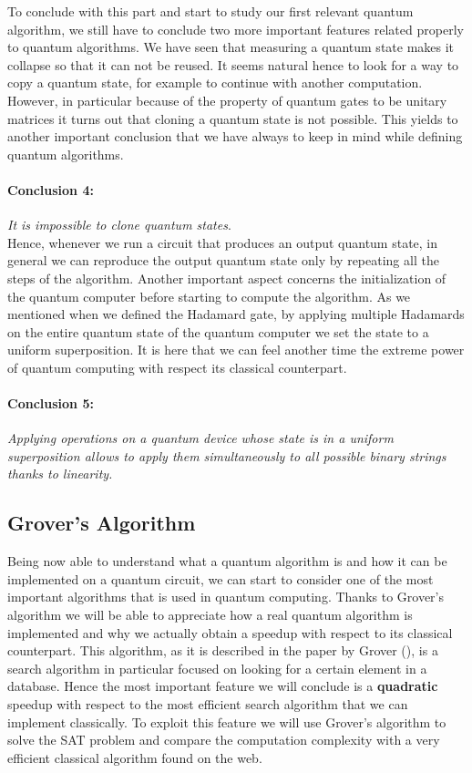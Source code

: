 \documentclass[english]{article}
\begin{document}
			To conclude with this part and start to study our first relevant quantum algorithm, we still have to conclude two more important features related properly to quantum algorithms. We have seen that measuring a quantum state makes it collapse so that it can not be reused. It seems natural hence to look for a way to copy a quantum state, for example to continue with another computation. However, in particular because of the property of quantum gates to be unitary matrices it turns out that cloning a quantum state is not possible. This yields to another important conclusion that we have always to keep in mind while defining quantum algorithms.
			
			\paragraph{Conclusion 4:} \label{conc:noCloning} \emph{It is impossible to clone quantum states}.\\
			
			Hence, whenever we run a circuit that produces an output quantum state, in general we can reproduce the output quantum state only by repeating all the steps of the algorithm.
			Another important aspect concerns the initialization of the quantum computer before starting to compute the algorithm. As we mentioned when we defined the Hadamard gate, by applying multiple Hadamards on the entire quantum state of the quantum computer we set the state to a uniform superposition. It is here that we can feel another time the extreme power of quantum computing with respect its classical counterpart.
			
			\paragraph{Conclusion 5:} \label{conc:superposition} \emph{Applying operations on a quantum device whose state is in a uniform superposition allows to apply them simultaneously to all possible binary strings thanks to linearity.} 
			
		\subsection{Grover's Algorithm}
		\label{sec:grover}
			Being now able to understand what a quantum algorithm is and how it can be implemented on a quantum circuit, we can start to consider one of the most important algorithms that is used in quantum computing. Thanks to Grover's algorithm we will be able to appreciate how a real quantum algorithm is implemented and why we actually obtain a speedup with respect to its classical counterpart. This algorithm, as it is described in the paper by Grover (\cite{grover}), is a search algorithm in particular focused on looking for a certain element in a database. Hence the most important feature we will conclude is a \textbf{quadratic} speedup with respect to the most efficient search algorithm that we can implement classically. To exploit this feature we will use Grover's algorithm to solve the SAT problem and compare the computation complexity with a very efficient classical algorithm found on the web. 
			
\end{document}
